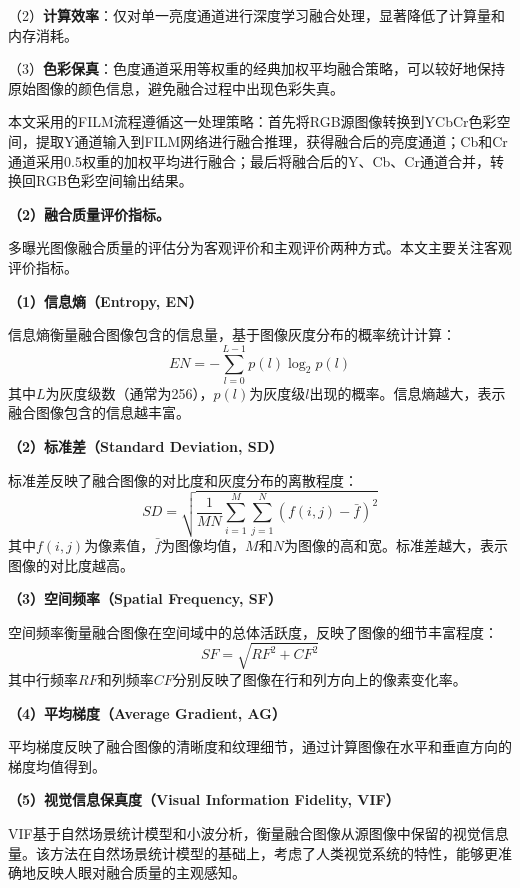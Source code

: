 （2）\textbf{计算效率}：仅对单一亮度通道进行深度学习融合处理，显著降低了计算量和内存消耗。

（3）\textbf{色彩保真}：色度通道采用等权重的经典加权平均融合策略，可以较好地保持原始图像的颜色信息，避免融合过程中出现色彩失真。

本文采用的FILM流程遵循这一处理策略：首先将RGB源图像转换到YCbCr色彩空间，提取Y通道输入到FILM网络进行融合推理，获得融合后的亮度通道；Cb和Cr通道采用0.5权重的加权平均进行融合；最后将融合后的Y、Cb、Cr通道合并，转换回RGB色彩空间输出结果。

\textbf{（2）融合质量评价指标。}\label{sec:metrics}

多曝光图像融合质量的评估分为客观评价和主观评价两种方式。本文主要关注客观评价指标。

\textbf{（1）信息熵（Entropy, EN）}

信息熵衡量融合图像包含的信息量，基于图像灰度分布的概率统计计算：
\begin{equation}
    EN = -\sum_{l=0}^{L-1} p(l) \log_2 p(l)
\end{equation}
其中$L$为灰度级数（通常为256），$p(l)$为灰度级$l$出现的概率。信息熵越大，表示融合图像包含的信息越丰富。

\textbf{（2）标准差（Standard Deviation, SD）}

标准差反映了融合图像的对比度和灰度分布的离散程度：
\begin{equation}
    SD = \sqrt{\frac{1}{MN}\sum_{i=1}^{M}\sum_{j=1}^{N}(f(i,j) - \bar{f})^2}
\end{equation}
其中$f(i,j)$为像素值，$\bar{f}$为图像均值，$M$和$N$为图像的高和宽。标准差越大，表示图像的对比度越高。

\textbf{（3）空间频率（Spatial Frequency, SF）}

空间频率衡量融合图像在空间域中的总体活跃度，反映了图像的细节丰富程度：
\begin{equation}
    SF = \sqrt{RF^2 + CF^2}
\end{equation}
其中行频率$RF$和列频率$CF$分别反映了图像在行和列方向上的像素变化率。

\textbf{（4）平均梯度（Average Gradient, AG）}

平均梯度反映了融合图像的清晰度和纹理细节，通过计算图像在水平和垂直方向的梯度均值得到。

\textbf{（5）视觉信息保真度（Visual Information Fidelity, VIF）}

VIF基于自然场景统计模型和小波分析，衡量融合图像从源图像中保留的视觉信息量。该方法在自然场景统计模型的基础上，考虑了人类视觉系统的特性，能够更准确地反映人眼对融合质量的主观感知。

